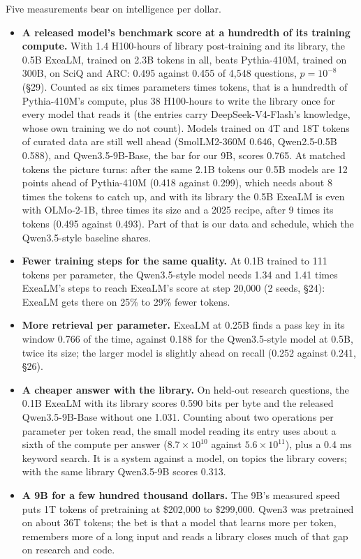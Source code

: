 \documentclass[11pt,letterpaper]{article}
\newcommand{\sect}[1]{\S#1}
\begin{document}
Five measurements bear on intelligence per dollar.
\begin{itemize}
\item \textbf{A released model's benchmark score at a hundredth of its training compute.} With 1.4 H100-hours of library post-training and its library, the 0.5B ExeaLM, trained on 2.3B tokens in all, beats Pythia-410M, trained on 300B, on SciQ and ARC: 0.495 against 0.455 of 4,548 questions, $p = 10^{-8}$ (\sect{29}). Counted as six times parameters times tokens, that is a hundredth of Pythia-410M's compute, plus 38 H100-hours to write the library once for every model that reads it (the entries carry DeepSeek-V4-Flash's knowledge, whose own training we do not count). Models trained on 4T and 18T tokens of curated data are still well ahead (SmolLM2-360M 0.646, Qwen2.5-0.5B 0.588), and Qwen3.5-9B-Base, the bar for our 9B, scores 0.765. At matched tokens the picture turns: after the same 2.1B tokens our 0.5B models are 12 points ahead of Pythia-410M (0.418 against 0.299), which needs about 8 times the tokens to catch up, and with its library the 0.5B ExeaLM is even with OLMo-2-1B, three times its size and a 2025 recipe, after 9 times its tokens (0.495 against 0.493). Part of that is our data and schedule, which the Qwen3.5-style baseline shares.
\item \textbf{Fewer training steps for the same quality.} At 0.1B trained to 111 tokens per parameter, the Qwen3.5-style model needs 1.34 and 1.41 times ExeaLM's steps to reach ExeaLM's score at step 20,000 (2 seeds, \sect{24}): ExeaLM gets there on 25\% to 29\% fewer tokens.
\item \textbf{More retrieval per parameter.} ExeaLM at 0.25B finds a pass key in its window 0.766 of the time, against 0.188 for the Qwen3.5-style model at 0.5B, twice its size; the larger model is slightly ahead on recall (0.252 against 0.241, \sect{26}).
\item \textbf{A cheaper answer with the library.} On held-out research questions, the 0.1B ExeaLM with its library scores 0.590 bits per byte and the released Qwen3.5-9B-Base without one 1.031. Counting about two operations per parameter per token read, the small model reading its entry uses about a sixth of the compute per answer ($8.7\times10^{10}$ against $5.6\times10^{11}$), plus a 0.4 ms keyword search. It is a system against a model, on topics the library covers; with the same library Qwen3.5-9B scores 0.313.
\item \textbf{A 9B for a few hundred thousand dollars.} The 9B's measured speed puts 1T tokens of pretraining at \$202,000 to \$299,000. Qwen3 was pretrained on about 36T tokens; the bet is that a model that learns more per token, remembers more of a long input and reads a library closes much of that gap on research and code.
\end{itemize}
\end{document}
